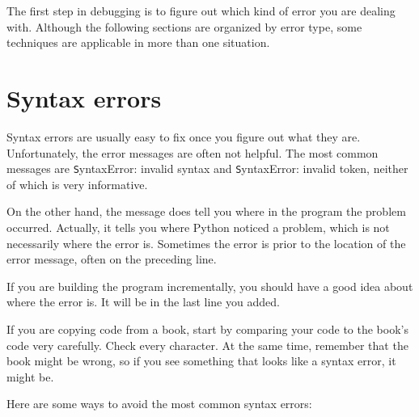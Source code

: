 \documentclass[
DIV=11,
fontsize=13,
twoside,
headinclude=false,
titlepage=firstiscover,
abstract=true,
headsepline=true,
footsepline=true,
chapterprefix=true, %
headings=big,
bibliography=totoc,%
captions=tableheading
]{scrbook}
\theoremstyle{definition}
\begin{document}
The first step in debugging is to figure out which kind of
error you are dealing with.  Although the following sections are
organized by error type, some techniques are
applicable in more than one situation.


\section{Syntax errors}

Syntax errors are usually easy to fix once you figure out what they
are.  Unfortunately, the error messages are often not helpful.
The most common messages are {\texttt SyntaxError: invalid syntax} and
{\texttt SyntaxError: invalid token}, neither of which is very informative.

On the other hand, the message does tell you where in the program the
problem occurred.  Actually, it tells you where Python
noticed a problem, which is not necessarily where the error
is.  Sometimes the error is prior to the location of the error
message, often on the preceding line.

If you are building the program incrementally, you should have
a good idea about where the error is.  It will be in the last
line you added.

If you are copying code from a book, start by comparing
your code to the book's code very carefully.  Check every character.
At the same time, remember that the book might be wrong, so
if you see something that looks like a syntax error, it might be.

Here are some ways to avoid the most common syntax errors:
\end{document}

